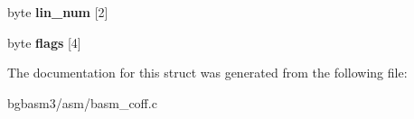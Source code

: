 \begin{DoxyCompactItemize}
\item 
\hypertarget{structbasm__coff__sec__s_a1377a4275aad576697b5c5271018def8}{byte {\bfseries lin\-\_\-num} \mbox{[}2\mbox{]}}\label{structbasm__coff__sec__s_a1377a4275aad576697b5c5271018def8}

\item 
\hypertarget{structbasm__coff__sec__s_addf6e80258747a4e0cad7cf150c1b829}{byte {\bfseries flags} \mbox{[}4\mbox{]}}\label{structbasm__coff__sec__s_addf6e80258747a4e0cad7cf150c1b829}

\end{DoxyCompactItemize}


The documentation for this struct was generated from the following file\-:\begin{DoxyCompactItemize}
\item 
bgbasm3/asm/basm\-\_\-coff.\-c\end{DoxyCompactItemize}
